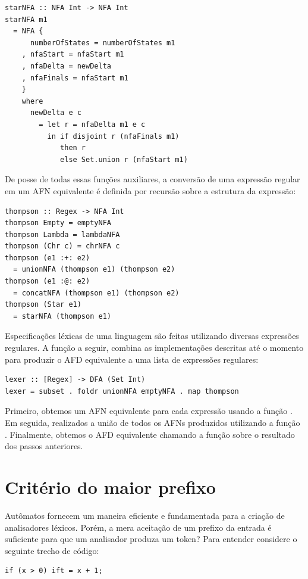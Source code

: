 \begin{verbatim}
starNFA :: NFA Int -> NFA Int
starNFA m1
  = NFA {
      numberOfStates = numberOfStates m1
    , nfaStart = nfaStart m1
    , nfaDelta = newDelta
    , nfaFinals = nfaStart m1
    }
    where
      newDelta e c
        = let r = nfaDelta m1 e c
          in if disjoint r (nfaFinals m1)
             then r
             else Set.union r (nfaStart m1)
\end{verbatim}

De posse de todas essas funções auxiliares, a conversão de uma
expressão regular em um AFN equivalente é definida por recursão sobre
a estrutura da expressão:

\begin{verbatim}
thompson :: Regex -> NFA Int
thompson Empty = emptyNFA
thompson Lambda = lambdaNFA
thompson (Chr c) = chrNFA c
thompson (e1 :+: e2)
  = unionNFA (thompson e1) (thompson e2)
thompson (e1 :@: e2)
  = concatNFA (thompson e1) (thompson e2)
thompson (Star e1)
  = starNFA (thompson e1)
\end{verbatim}

Especificações léxicas de uma linguagem são feitas utilizando
diversas expressões regulares. A função a seguir, combina as
implementações descritas até o momento para produzir o AFD
equivalente a uma lista de expressões regulares:

\begin{verbatim}
lexer :: [Regex] -> DFA (Set Int)
lexer = subset . foldr unionNFA emptyNFA . map thompson
\end{verbatim}

Primeiro, obtemos um AFN equivalente para cada expressão usando a
função . Em seguida, realizados a
união de todos os AFNs produzidos utilizando a função
. Finalmente, obtemos o AFD
equivalente chamando a função  sobre
o resultado dos passos anteriores.

\section{Critério do maior prefixo}

Autômatos fornecem um maneira eficiente e fundamentada para a criação
de analisadores léxicos. Porém, a mera aceitação de um prefixo da
entrada é suficiente para que um analisador produza um token? Para
entender considere o seguinte trecho de código:

\begin{verbatim}
if (x > 0) ift = x + 1;
\end{verbatim}

